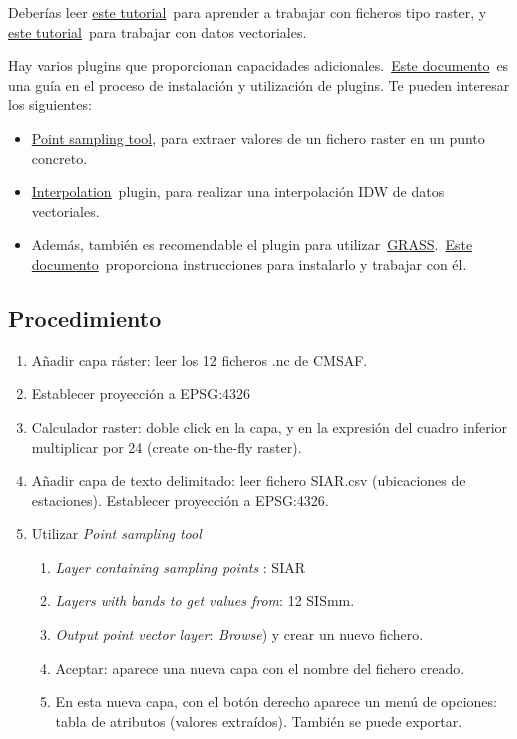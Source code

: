 \documentclass[11pt]{article}
\begin{document}
Deberías leer \href{https://docs.qgis.org/3.22/es/docs/user\_manual/working\_with\_raster/index.html}{este tutorial} para aprender a trabajar con ficheros tipo
raster, y \href{http://docs.qgis.org/3.22/es/docs/user\_manual/working\_with\_vector/index.html}{este tutorial} para trabajar con datos vectoriales.

Hay varios plugins que proporcionan capacidades adicionales. \href{https://docs.qgis.org/3.22/es/docs/training\_manual/qgis\_plugins/fetching\_plugins.html}{Este
documento} es una guía en el proceso de instalación y utilización de
plugins. Te pueden interesar los siguientes:

\begin{itemize}
\item \href{https://plugins.qgis.org/plugins/pointsamplingtool/}{Point sampling tool}, para extraer valores de un fichero raster en un
punto concreto.
\item \href{https://docs.qgis.org/3.22/es/docs/user\_manual/plugins/plugins\_interpolation.html}{Interpolation} plugin, para realizar una interpolación IDW de datos
vectoriales.
\item Además, también es recomendable el plugin para utilizar \href{https://grass.osgeo.org/}{GRASS}. \href{http://docs.qgis.org/3.22/es/docs/user\_manual/grass\_integration/grass\_integration.html}{Este
documento} proporciona instrucciones para instalarlo y trabajar con
él.
\end{itemize}

\subsection*{Procedimiento}
\label{sec:orge72c353}

\begin{enumerate}
\item Añadir capa ráster: leer los 12 ficheros .nc de CMSAF.
\item Establecer proyección a EPSG:4326
\item Calculador raster: doble click en la capa, y en la expresión del
cuadro inferior multiplicar por 24 (create on-the-fly raster).
\item Añadir capa de texto delimitado: leer fichero SIAR.csv (ubicaciones
de estaciones). Establecer proyección a EPSG:4326.
\item Utilizar \emph{Point sampling tool}
\begin{enumerate}
\item \emph{Layer containing sampling points} : SIAR
\item \emph{Layers with bands to get values from}: 12 SISmm.
\item \emph{Output point vector layer}: \emph{Browse}) y crear un nuevo fichero.
\item Aceptar: aparece una nueva capa con el nombre del fichero creado.
\item En esta nueva capa, con el botón derecho aparece un menú de
  opciones: tabla de atributos (valores extraídos). También se puede
  exportar.
\end{enumerate}
\end{enumerate}
\end{document}
